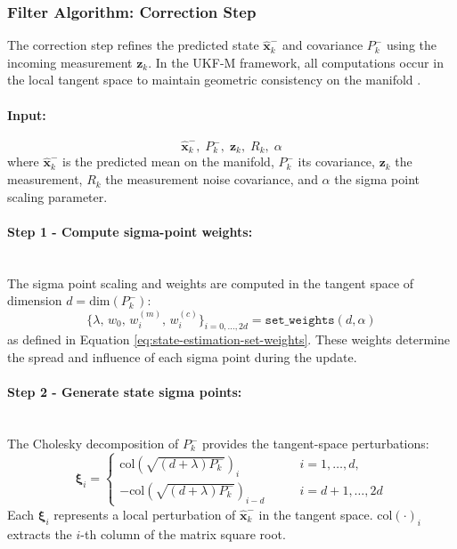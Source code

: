 \subsubsection{Filter Algorithm: Correction Step}
The correction step refines the predicted state $\hat{\mathbf{x}}_{k}^{-}$ and covariance $P_{k}^{-}$ using the incoming measurement $\mathbf{z}_k$. In the UKF-M framework, all computations occur in the local tangent space to maintain geometric consistency on the manifold \cite{ukf_manifold_code}\cite{ukf_on_lie_groups}.

\paragraph{Input:}
$$
    \hat{\mathbf{x}}_{k}^{-}, \; P_{k}^{-}, \; \mathbf{z}_k, \; R_k, \; \alpha
$$
where $\hat{\mathbf{x}}_{k}^{-}$ is the predicted mean on the manifold, $P_{k}^{-}$ its covariance, $\mathbf{z}_k$ the measurement, $R_k$ the measurement noise covariance, and $\alpha$ the sigma point scaling parameter.

\paragraph{Step 1 - Compute sigma-point weights:} \mbox{}\\[0.5em] \noindent
The sigma point scaling and weights are computed in the tangent space of dimension $d = \mathrm{dim}(P_k^{-})$:
$$
    \{\lambda,\, w_0,\, w_i^{(m)},\, w_i^{(c)}\}_{i=0,\ldots,2d} = \texttt{set\_weights}(d, \alpha)
$$
as defined in Equation \ref{eq:state-estimation-set-weights}. These weights determine the spread and influence of each sigma point during the update.

\paragraph{Step 2 - Generate state sigma points:} \mbox{}\\[0.5em] \noindent
The Cholesky decomposition of $P_k^{-}$ provides the tangent-space perturbations:
$$
    \boldsymbol{\xi}_i =
    \begin{cases}
        \text{col}\!\left(\sqrt{(d+\lambda)P_k^{-}}\right)_i \qquad & i = 1,\ldots,d, \\[4pt]
        -\text{col}\!\left(\sqrt{(d+\lambda)P_k^{-}}\right)_{i-d} \qquad & i = d+1,\ldots,2d
    \end{cases}
$$
Each $\boldsymbol{\xi}_i$ represents a local perturbation of $\hat{\mathbf{x}}_{k}^{-}$ in the tangent space. $\text{col}(\cdot)_i$ extracts the $i$-th column of the matrix square root.

